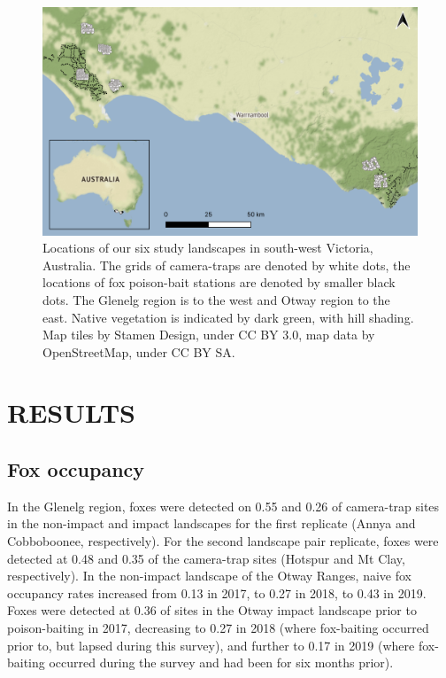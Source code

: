 \documentclass[]{elsarticle} %
\begin{document}
\newpage

\begin{figure}
\includegraphics[width=1\linewidth]{figs/fig1} \caption{Locations of our six study landscapes in south-west Victoria, Australia. The grids of camera-traps are denoted by white dots, the locations of fox poison-bait stations are denoted by smaller black dots. The Glenelg region is to the west and Otway region to the east. Native vegetation is indicated by dark green, with hill shading. Map tiles by Stamen Design, under CC BY 3.0, map data by OpenStreetMap, under CC BY SA.}\label{fig:map}
\end{figure}

\newpage

\hypertarget{results}{%
\section{RESULTS}\label{results}}

\hypertarget{fox-occupancy}{%
\subsection{Fox occupancy}\label{fox-occupancy}}

In the Glenelg region, foxes were detected on 0.55 and 0.26 of camera-trap sites in the non-impact and impact landscapes for the first replicate (Annya and Cobboboonee, respectively). For the second landscape pair replicate, foxes were detected at 0.48 and 0.35 of the camera-trap sites (Hotspur and Mt Clay, respectively). In the non-impact landscape of the Otway Ranges, naive fox occupancy rates increased from 0.13 in 2017, to 0.27 in 2018, to 0.43 in 2019. Foxes were detected at 0.36 of sites in the Otway impact landscape prior to poison-baiting in 2017, decreasing to 0.27 in 2018 (where fox-baiting occurred prior to, but lapsed during this survey), and further to 0.17 in 2019 (where fox-baiting occurred during the survey and had been for six months prior).
\end{document}
